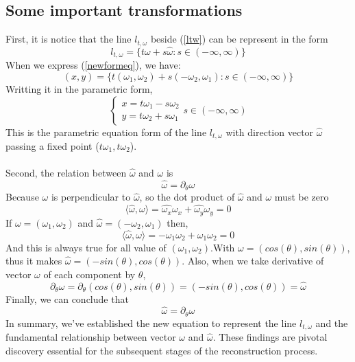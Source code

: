 \documentclass[a4paper]{article}
\begin{document}
\subsection{Some important transformations}
First, it is notice that the line $l_{t,\omega}$ beside (\ref{ltw}) can be represent in the form
\begin{equation}\label{newformeq}
    l_{t,\omega} = \{ t\omega + s\hat{\omega}: s \in (-\infty,\infty )\} 
\end{equation}
When we express (\ref{newformeq}), we have:
\begin{equation*}
    (x,y) = \{t(\omega_1,\omega_2) + s(-\omega_2,\omega_1) : s \in (-\infty,\infty )\}
\end{equation*}
Writting it in the parametric form,
\[\begin{cases}
    x=t\omega_1 - s\omega_2\\
    y=t\omega_2 + s\omega_1
\end{cases}
s\in (-\infty,\infty)\]
This is the parametric equation form of the line $l_{t,\omega}$ with direction vector $\hat{\omega}$ passing a fixed point ($t\omega_1,t\omega_2$).\\ \\
Second, the relation between $\hat{\omega}$ and $\omega$ is
\begin{equation}\label{difhat}
    \hat{\omega} = \partial_\theta\omega 
\end{equation}
Because $\omega$ is perpendicular to $\hat{\omega}$, so the dot product of $\hat{\omega}$ and $\omega$ must be zero
\begin{equation*}
    \langle \hat{\omega},\omega \rangle = \hat{\omega_x}\omega_x + \hat{\omega_y}\omega_y = 0
\end{equation*}
If $\omega = (\omega_1,\omega_2)$ and $\hat{\omega} = (-\omega_2,\omega_1)$ then,
\begin{equation*}
    \langle \hat{\omega},\omega \rangle = -\omega_1\omega_2 + \omega_1\omega_2 = 0
\end{equation*}
And this is always true for all value of $(\omega_1,\omega_2)$.With $\omega = (cos(\theta),sin(\theta))$, thus it makes $\hat{\omega} = (-sin(\theta),cos(\theta))$. Also, when we take derivative of vector $\omega$ of each component by $\theta$,
\begin{equation*}
    \partial_\theta\omega = \partial_\theta(cos(\theta),sin(\theta)) = (-sin(\theta),cos(\theta)) = \hat{\omega}
\end{equation*}
Finally, we can conclude that
\begin{equation*}
    \hat{\omega} = \partial_\theta\omega 
\end{equation*}
In summary, we've established the new equation to represent the line $l_{t,\omega}$ and the fundamental relationship between vector $\omega$ and $\hat{\omega}$. These findings are pivotal discovery essential for the subsequent stages of the reconstruction process. 
\end{document}
